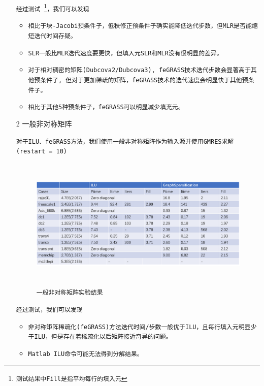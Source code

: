 \documentclass[11pt, a4paper]{article}
\theoremstyle{plain}
\theoremstyle{plain}
\theoremstyle{plain}
\theoremstyle{definition}
\theoremstyle{remark}
\theoremstyle{definition}
\newcommand{\T}[1]{\texttt{#1}}
\begin{document}
\begin{itemize}
	\T{经过测试	\footnote{\T{测试结果中Fill是指平均每行的填入元}}，我们可以发现}
	\begin{itemize}
		\item \T{相比于块-Jacobi预条件子，低秩修正预条件子确实能降低迭代步数，但MLR是否能缩短迭代时间存疑。}
		
		\item \T{SLR一般比MLR迭代速度要更快，但填入元SLR和MLR没有很明显的差异。}
		
		\item \T{对于相对稠密的矩阵(Dubcova2/Dubcova3), feGRASS技术迭代步数会显著高于其他预条件子, 但对于更加稀疏的矩阵，feGRASS技术的迭代速度会明显快于其他预条件子。}
		
		\item \T{相比于其他5种预条件子，feGRASS可以明显减少填充元。}
	\end{itemize}
	
	
	
	\item[2] 一般非对称矩阵
	
	\T{对于ILU、feGRASS方法，我们使用一般非对称矩阵作为输入源并使用GMRES求解(restart = 10)}
	
	\begin{figure}[H]
		\caption{\T{一般非对称矩阵实验结果}}
		\centering
		\includegraphics[width=350pt,height=180pt]{normal.png}
	\end{figure}
	\T{经过测试，我们可以发现}
	\begin{itemize}
		\item \T{非对称矩阵稀疏化(feGRASS)方法迭代时间/步数一般优于ILU，且每行填入元明显少于ILU，但是存在着稀疏化以后矩阵接近奇异的问题。}
		\item \T{Matlab ILU命令可能无法得到分解结果。}
	\end{itemize}

\end{itemize}
\end{document}
